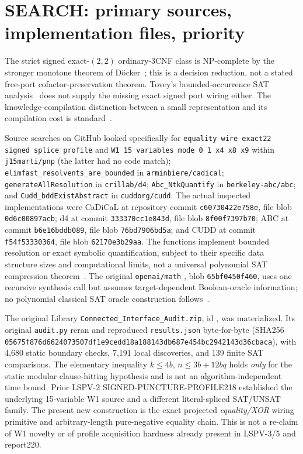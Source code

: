 \documentclass[11pt]{article}
\begin{document}
\section{SEARCH: primary sources, implementation files, priority}
The strict signed exact-$(2,2)$ ordinary-3CNF class is NP-complete by the stronger monotone theorem of D\"ocker~\cite{docker2019}; this is a decision reduction, not a stated free-port cofactor-preservation theorem. Tovey's bounded-occurrence SAT analysis~\cite{tovey1984} does not supply the missing exact signed port wiring either. The knowledge-compilation distinction between a small representation and its compilation cost is standard~\cite{darwiche2002}.

Source searches on GitHub looked specifically for \texttt{equality wire exact22 signed splice profile} and \texttt{W1 15 variables mode 0 1 x4 x8 x9} within \texttt{j15marti/pnp} (the latter had no code match); \texttt{elimfast\_resolvents\_are\_bounded} in \texttt{arminbiere/cadical}; \texttt{generateAllResolution} in \texttt{crillab/d4}; \texttt{Abc\_NtkQuantify} in \texttt{berkeley-abc/abc}; and \texttt{Cudd\_bddExistAbstract} in \texttt{cuddorg/cudd}. The actual inspected implementations were CaDiCaL  at repository commit \texttt{c60730422e758e}, file blob \texttt{0d6c00897acb}; d4  at commit \texttt{333370cc1e843d}, file blob \texttt{8f00f7397b70}; ABC  at commit \texttt{b6e16bddb089}, file blob \texttt{76bd7906bd5a}; and CUDD  at commit \texttt{f54f53330364}, file blob \texttt{62170e3b29aa}. The functions implement bounded resolution or exact symbolic quantification, subject to their specific data structure sizes and computational limits, not a universal polynomial SAT compression theorem~\cite{cadical,d4,abc,cudd}. The original \texttt{openai/math} , blob \texttt{65bf0450f460}, uses one recursive synthesis call but assumes target-dependent Boolean-oracle information; no polynomial classical SAT oracle construction follows~\cite{openai2026}.

The original Library \texttt{Connected\_Interface\_Audit.zip}, id , was materialized. Its original \texttt{audit.py} reran and reproduced \texttt{results.json} byte-for-byte (SHA256 \texttt{05675f876d6624073507df1e9cedd18a188143db687e454bc2942143d36cbaca}), with 4,680 static boundary checks, 7,191 local discoveries, and 139 finite SAT comparisons. The elementary inequality $k\le4b$, $n\le3b+12bq$ holds \emph{only} for the static modular clause-hitting hypothesis and is not an algorithm-independent time bound. Prior LSPV-2 SIGNED-PUNCTURE-PROFILE218 established the underlying 15-variable W1 source and a different literal-spliced SAT/UNSAT family. The present new construction is the exact projected \emph{equality/XOR} wiring primitive and arbitrary-length pure-negative equality chain. This is not a re-claim of W1 novelty or of profile acquisition hardness already present in LSPV-3/5 and report220.
\end{document}
